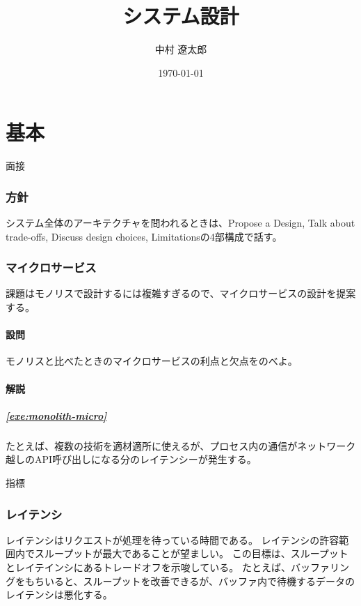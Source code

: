 \documentclass[book]{jlreq}
\begin{document}
\title{システム設計}
\author{中村 遼太郎}
\date{\today}
\maketitle
\tableofcontents
\part{基本}
\begin{chapter-bib}{面接}
  \section{方針}
  システム全体のアーキテクチャを問われるときは、Propose a Design, Talk about trade-offs, Discuss design choices, Limitationsの4部構成で話す\cite{lc-high}。
  \section{マイクロサービス}
  課題はモノリスで設計するには複雑すぎるので、マイクロサービスの設計を提案する\cite{lc-aa}。
  \subsection{設問}
  \begin{exercise}
  \item モノリスと比べたときのマイクロサービスの利点と欠点をのべよ。\label{exe:monolith-micro}  
  \end{exercise}
  \subsection{解説}
  \subsubsection{\ref{exe:monolith-micro}}
  たとえば、複数の技術を適材適所に使えるが、プロセス内の通信がネットワーク越しのAPI呼び出しになる分のレイテンシーが発生する\cite{lc-aa}。
\end{chapter-bib}
\begin{chapter-bib}{指標}
  \section{レイテンシ}
  レイテンシはリクエストが処理を待っている時間である\cite{sdi}。
  レイテンシの許容範囲内でスループットが最大であることが望ましい\cite{sasp}。
  この目標は、スループットとレイテインシにあるトレードオフを示唆している。
  たとえば、バッファリングをもちいると、スループットを改善できるが、バッファ内で待機するデータのレイテンシは悪化する。
\end{chapter-bib}
\end{document}
